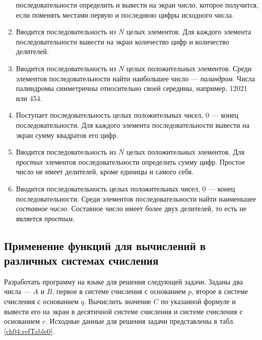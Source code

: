 \begin{enumerate}
последовательности определить и вывести на экран число, которое получится, если поменять местами первую и последнюю
цифры исходного числа.
\item Вводится последовательность из $N$ целых элементов. Для каждого элемента последовательности вывести на экран
количество цифр и количество делителей.
\item Вводится последовательность из $N$ целых положительных элементов. Среди элементов последовательности найти
наибольшее число --- \emph{палиндром}. Числа палиндромы симметричны относительно своей середины, например,
12021 или 454.
\item Поступает последовательность целых положительных чисел, 0 --- конец последовательности. Для каждого элемента
последовательности вывести на экран сумму квадратов его цифр.
\item Вводится последовательность из $N$ целых положительных элементов. Для \emph{простых} элементов
последовательности определить сумму цифр. Простое число не имеет делителей, кроме единицы и самого себя.
\item Вводится последовательность целых положительных чисел, 0 --- конец последовательности. Среди элементов
последовательности найти наименьшее \emph{составное число}. Составное число имеет более двух делителей, то
есть не является \emph{простым}.
\end{enumerate}

\subsection[Применение функций для вычислений в различных системах счисления]{Применение функций для вычислений в
различных системах счисления}
Разработать программу на языке  для решения следующей задачи. Заданы два числа --- $A$ и
$B$, первое в системе счисления с основанием $p$, второе в системе счисления с
основанием $q$. Вычислить значение $C$ по указанной формуле и вывести его на экран
в десятичной системе счисления и системе счисления с основанием $r$. Исходные данные для решения
задачи представлены в табл. \ref{ch04:refTable0}.

